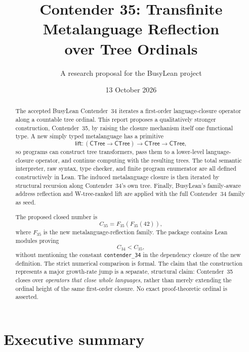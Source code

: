 \documentclass[11pt]{article}
\title{\textbf{Contender 35: Transfinite Metalanguage Reflection\\over Tree Ordinals}}
\author{A research proposal for the BusyLean project}
\date{13 October 2026}
\theoremstyle{definition}
\newcommand{\CTree}{\mathsf{CTree}}
\newcommand{\Fthirtyfive}{F_{35}}
\newcommand{\Cthirtyfour}{C_{34}}
\newcommand{\Cthirtyfive}{C_{35}}
\newcommand{\code}[1]{\texttt{#1}}
\begin{document}
\maketitle

\begin{abstract}
The accepted BusyLean Contender~34 iterates a first-order language-closure
operator along a countable tree ordinal.  This report proposes a qualitatively
stronger construction, Contender~35, by raising the closure mechanism itself
one functional type.  A new simply typed metalanguage has a primitive
\[
  \mathsf{lift} : (\CTree\to\CTree)\to\CTree\to\CTree,
\]
so programs can construct tree transformers, pass them to a lower-level
language-closure operator, and continue computing with the resulting trees.
The total semantic interpreter, raw syntax, type checker, and finite program
enumerator are all defined constructively in Lean.  The induced metalanguage
closure is then iterated by structural recursion along Contender~34's own tree.
Finally, BusyLean's family-aware address reflection and W-tree-ranked lift are
applied with the full Contender~34 family as seed.

The proposed closed number is
\[
  \Cthirtyfive = \Fthirtyfive(\Fthirtyfive(42)),
\]
where \(\Fthirtyfive\) is the new metalanguage-reflection family.  The package
contains Lean modules proving
\[
  \Cthirtyfour < \Cthirtyfive,
\]
without mentioning the constant \code{contender\_34} in the dependency closure
of the new definition.  The strict numerical comparison is formal.  The claim
that the construction represents a major growth-rate jump is a separate,
structural claim: Contender~35 closes over \emph{operators that close whole
languages}, rather than merely extending the ordinal height of the same
first-order closure.  No exact proof-theoretic ordinal is asserted.
\end{abstract}

\tableofcontents
\newpage

\section{Executive summary}
\end{document}
